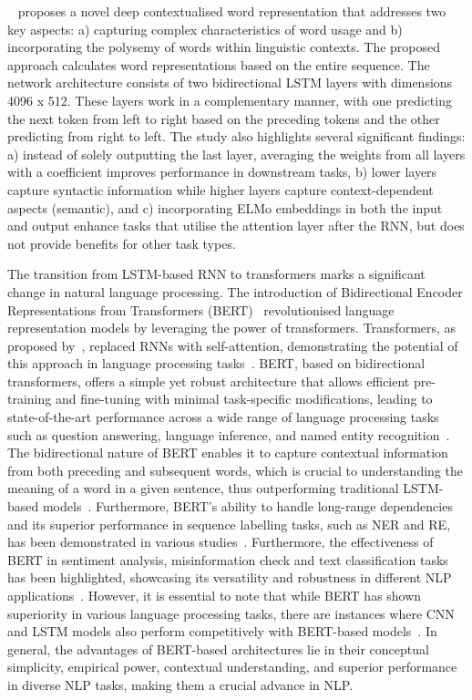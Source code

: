 ~\cite{peters2018deep} proposes a novel deep contextualised word representation that addresses two key aspects: a) capturing complex characteristics of word usage and b) incorporating the polysemy of words within linguistic contexts. The proposed approach calculates word representations based on the entire sequence. The network architecture consists of two bidirectional LSTM layers with dimensions 4096 x 512. These layers work in a complementary manner, with one predicting the next token from left to right based on the preceding tokens and the other predicting from right to left. The study also highlights several significant findings: a) instead of solely outputting the last layer, averaging the weights from all layers with a coefficient improves performance in downstream tasks, b) lower layers capture syntactic information while higher layers capture context-dependent aspects (semantic), and c) incorporating ELMo embeddings in both the input and output enhance tasks that utilise the attention layer after the RNN, but does not provide benefits for other task types.

The transition from LSTM-based RNN to transformers marks a significant change in natural language processing. The introduction of Bidirectional Encoder Representations from Transformers (BERT)~\cite{devlin2018bert} revolutionised language representation models by leveraging the power of transformers. Transformers, as proposed by~\cite{devlin2018bert}, replaced RNNs with self-attention, demonstrating the potential of this approach in language processing tasks~\cite{vaswani2017attention}. 
BERT, based on bidirectional transformers, offers a simple yet robust architecture that allows efficient pre-training and fine-tuning with minimal task-specific modifications, leading to state-of-the-art performance across a wide range of language processing tasks such as question answering, language inference, and named entity recognition~\cite{devlin2018bert, joshi2019bert}. The bidirectional nature of BERT enables it to capture contextual information from both preceding and subsequent words, which is crucial to understanding the meaning of a word in a given sentence, thus outperforming traditional LSTM-based models~\cite{lee2019biobert, joshi2020deep}. Furthermore, BERT's ability to handle long-range dependencies and its superior performance in sequence labelling tasks, such as NER and RE, has been demonstrated in various studies~\cite{jung2021dg, hafiane2020experiments,kim2020korean}. Furthermore, the effectiveness of BERT in sentiment analysis, misinformation check and text classification tasks has been highlighted, showcasing its versatility and robustness in different NLP applications~\cite{ng2022modelling, shreyashree2022bert, taha2023automated}. 
However, it is essential to note that while BERT has shown superiority in various language processing tasks, there are instances where CNN and LSTM models also perform competitively with BERT-based models~\cite{joshi2021evaluation,velankar2021hate}. 
In general, the advantages of BERT-based architectures lie in their conceptual simplicity, empirical power, contextual understanding, and superior performance in diverse NLP tasks, making them a crucial advance in NLP. 

